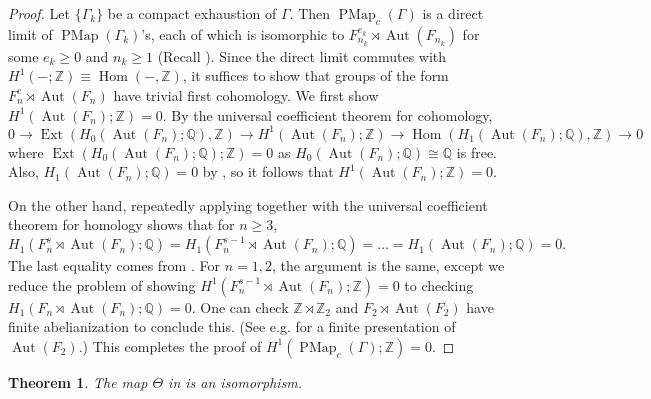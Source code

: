 \documentclass[11pt]{amsart}
\theoremstyle{plain}
\newtheorem{THM}{Theorem}[section]
\theoremstyle{definition}
\DeclareMathOperator{\Aut}{Aut}
\DeclareMathOperator{\Hom}{Hom}
\DeclareMathOperator{\Ext}{Ext}
\DeclareMathOperator{\PMap}{PMap}
\newcommand{\Z}{\mathbb{Z}}
\newcommand{\bbQ}{\mathbb{Q}}
\def\G{{\Gamma}}
\newcommand{\<}{\langle}
\renewcommand{\>}{\rangle}
\begin{document}
  \begin{proof}
    Let $\{\G_k\}$ be a compact exhaustion of $\G$.
    Then $\PMap_c(\G)$ is a direct limit of $\PMap(\G_k)$'s, each of which is isomorphic to $F_{n_k}^{e_k} \rtimes \Aut(F_{n_k})$ for some $e_k \ge 0$ and $n_k \ge 1$ (Recall ). Since the direct limit commutes with $H^1(-;\Z) \equiv \Hom(-,\Z)$, it suffices to show that groups of the form $F_n^e \rtimes \Aut(F_n)$ have trivial first cohomology.
    We first show $H^1(\Aut(F_n);\Z)=0$. By the universal coefficient theorem for cohomology,
    \[
        0 \longrightarrow \Ext\left(H_0(\Aut(F_n);\bbQ),\Z\right) \longrightarrow
        H^1(\Aut(F_n);\Z)
        \longrightarrow
        \Hom(H_1(\Aut(F_n);\bbQ),\Z)
        \longrightarrow
        0
    \]
    where $\Ext\left(H_0(\Aut(F_n);\bbQ);\Z\right)=0$ as $H_0(\Aut(F_n);\bbQ)\cong \bbQ$ is free. Also, $H_1(\Aut(F_n);\bbQ)=0$ by , so it follows that $H^1(\Aut(F_n);\Z)=0$.
    
    On the other hand, repeatedly applying  together with the universal coefficient theorem for homology shows that for $n \ge 3$,
    \[
    H_1(F_n^{s} \rtimes \Aut(F_n);\bbQ) = H_1(F_n^{s-1} \rtimes \Aut(F_n);\bbQ) = \ldots = H_1(\Aut(F_n);\bbQ)=0.
    \]
    The last equality comes from .
    For $n=1,2$, the argument is the same, except we reduce the problem of showing $H^1(F_n^{s-1} \rtimes \Aut(F_n);\Z)=0$ to checking $H_1(F_n \rtimes \Aut(F_n);\bbQ)=0$. One can check $\Z \rtimes \Z_2$ and $F_2 \rtimes \Aut(F_2)$ have finite abelianization to conclude this. (See e.g. \cite[Corollary 2]{AFV2008presentation} for a finite presentation of $\Aut(F_2)$.) This completes the proof of $H^1(\PMap_c(\G); \Z)=0$.
  \end{proof}

\begin{THM} \label{thm:thetaSurjective}
    The map $\Theta$ in  is an isomorphism.
\end{THM}
\end{document}
